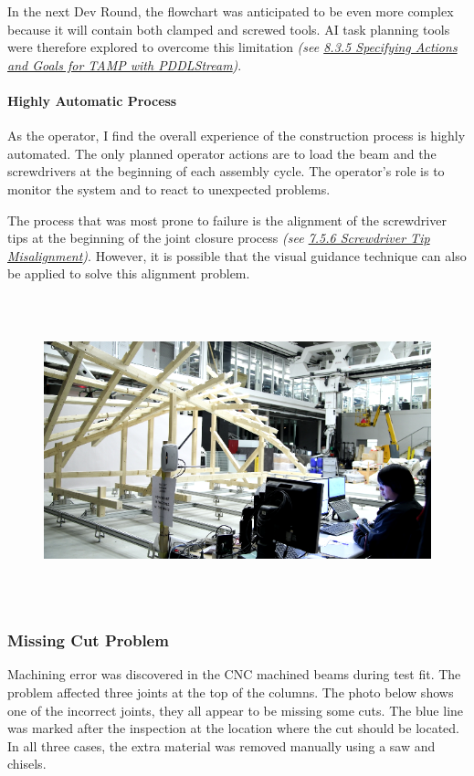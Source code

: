 \documentclass[11pt]{book}
\begin{document}
In the next Dev Round, the flowchart was anticipated to be even more complex because it will contain both clamped and screwed tools. AI task planning tools were therefore explored to overcome this limitation \textit{(see \uline{8.3.5 Specifying Actions and Goals for TAMP with PDDLStream})}. 

\paragraph{Highly Automatic Process}

As the operator, I find the overall experience of the construction process is highly automated. The only planned operator actions are to load the beam and the screwdrivers at the beginning of each assembly cycle. The operator’s role is to monitor the system and to react to unexpected problems.

The process that was most prone to failure is the alignment of the screwdriver tips at the beginning of the joint closure process \textit{(see \uline{7.5.6 Screwdriver Tip Misalignment})}. However, it is possible that the visual guidance technique can also be applied to solve this alignment problem. 

\begin{figure}[H]
\includegraphics[width=15.92cm,height=8.96cm]{./images/image82.png}
\end{figure}


\subsubsection{Missing Cut Problem}

Machining error was discovered in the CNC machined beams during test fit. The problem affected three joints at the top of the columns. The photo below shows one of the incorrect joints, they all appear to be missing some cuts. The blue line was marked after the inspection at the location where the cut should be located. In all three cases, the extra material was removed manually using a saw and chisels. 
\end{document}
